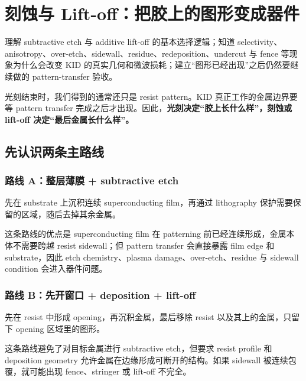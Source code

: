 \chapter{刻蚀与 Lift-off：把胶上的图形变成器件}

\begin{chaptergoal}
理解 subtractive etch 与 additive lift-off 的基本选择逻辑；知道 selectivity、anisotropy、over-etch、sidewall、residue、redeposition、undercut 与 fence 等现象为什么会改变 KID 的真实几何和微波损耗；建立“图形已经出现”之后仍然要继续做的 pattern-transfer 验收。
\end{chaptergoal}

光刻结束时，我们得到的通常还只是 resist pattern。KID 真正工作的金属边界要等 pattern transfer 完成之后才出现。因此，\textbf{光刻决定“胶上长什么样”，刻蚀或 lift-off 决定“最后金属长什么样”。}


\section{先认识两条主路线}

\subsection{路线 A：整层薄膜 + subtractive etch}

先在 substrate 上沉积连续 superconducting film，再通过 lithography 保护需要保留的区域，随后去掉其余金属。

这条路线的优点是 superconducting film 在 patterning 前已经连续形成，金属本体不需要跨越 resist sidewall；但 pattern transfer 会直接暴露 film edge 和 substrate，因此 etch chemistry、plasma damage、over-etch、residue 与 sidewall condition 会进入器件问题。

\subsection{路线 B：先开窗口 + deposition + lift-off}

先在 resist 中形成 opening，再沉积金属，最后移除 resist 以及其上的金属，只留下 opening 区域里的图形。

这条路线避免了对目标金属进行 subtractive etch，但要求 resist profile 和 deposition geometry 允许金属在边缘形成可断开的结构。如果 sidewall 被连续包覆，就可能出现 fence、stringer 或 lift-off 不完全。

